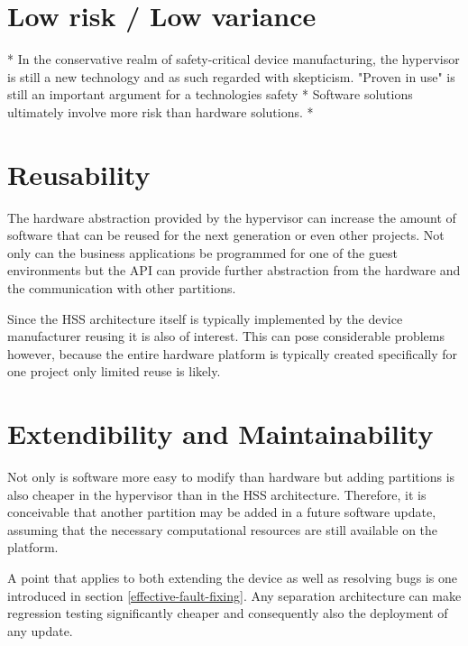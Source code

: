 \section{Low risk / Low variance}
* In the conservative realm of safety-critical device manufacturing, the hypervisor is still a new technology and as such regarded with skepticism. "Proven in use" is still an important argument for a technologies safety
* Software solutions ultimately involve more risk than hardware solutions.
* 


\section{Reusability}
The hardware abstraction provided by the hypervisor can increase the amount of software that can be reused for the next generation or even other projects. Not only can the business applications be programmed for one of the guest environments but the \gls{API} can provide further abstraction from the hardware and the communication with other partitions.

Since the \gls{HSS} architecture itself is typically implemented by the device manufacturer reusing it is also of interest. This can pose considerable problems however, because the entire hardware platform is typically created specifically for one project only limited reuse is likely.


\section{Extendibility and Maintainability}
Not only is software more easy to modify than hardware but adding partitions is also cheaper in the hypervisor than in the \gls{HSS} architecture. Therefore, it is conceivable that another partition may be added in a future software update, assuming that the necessary computational resources are still available on the platform. 

A point that applies to both extending the device as well as resolving bugs is one introduced in section \ref{effective-fault-fixing}. Any separation architecture can make regression testing significantly cheaper and consequently also the deployment of any update. 

